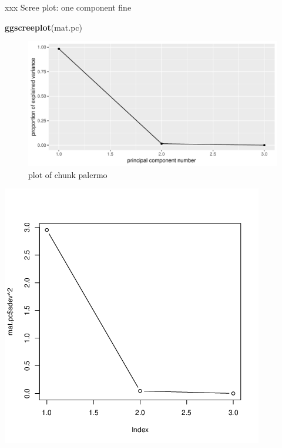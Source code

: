 \documentclass[ignorenonframetext,]{beamer}
\newenvironment{Shaded}{\begin{snugshade}}{\end{snugshade}}
\newcommand{\KeywordTok}[1]{\textcolor[rgb]{0.13,0.29,0.53}{\textbf{#1}}}
\newcommand{\NormalTok}[1]{#1}
\begin{document}
\begin{frame}[fragile]{xxx Scree plot: one component fine}
\protect\hypertarget{xxx-scree-plot-one-component-fine}{}

\begin{Shaded}
\begin{Highlighting}[]
\KeywordTok{ggscreeplot}\NormalTok{(mat.pc)}
\end{Highlighting}
\end{Shaded}

\begin{figure}
\centering
\includegraphics{figure/palermo-1.pdf}
\caption{plot of chunk palermo}
\end{figure}

\includegraphics{bPrincomp-pc-cov.png}

\end{frame}
\end{document}
